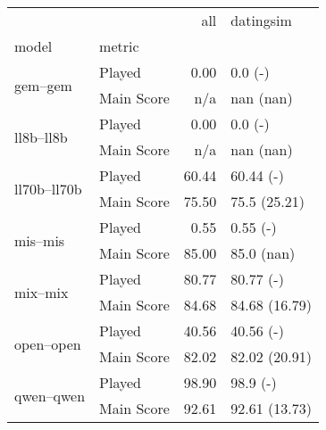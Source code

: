 \begin{tabular}{llrl}
\toprule
 &  & all & datingsim \\
model & metric &  &  \\
\midrule
\multirow[t]{2}{*}{gem--gem} & Played & 0.00 & 0.0 (-) \\
 & Main Score & n/a & nan (nan) \\
\cline{1-4}
\multirow[t]{2}{*}{ll8b--ll8b} & Played & 0.00 & 0.0 (-) \\
 & Main Score & n/a & nan (nan) \\
\cline{1-4}
\multirow[t]{2}{*}{ll70b--ll70b} & Played & 60.44 & 60.44 (-) \\
 & Main Score & 75.50 & 75.5 (25.21) \\
\cline{1-4}
\multirow[t]{2}{*}{mis--mis} & Played & 0.55 & 0.55 (-) \\
 & Main Score & 85.00 & 85.0 (nan) \\
\cline{1-4}
\multirow[t]{2}{*}{mix--mix} & Played & 80.77 & 80.77 (-) \\
 & Main Score & 84.68 & 84.68 (16.79) \\
\cline{1-4}
\multirow[t]{2}{*}{open--open} & Played & 40.56 & 40.56 (-) \\
 & Main Score & 82.02 & 82.02 (20.91) \\
\cline{1-4}
\multirow[t]{2}{*}{qwen--qwen} & Played & 98.90 & 98.9 (-) \\
 & Main Score & 92.61 & 92.61 (13.73) \\
\cline{1-4}
\bottomrule
\end{tabular}
